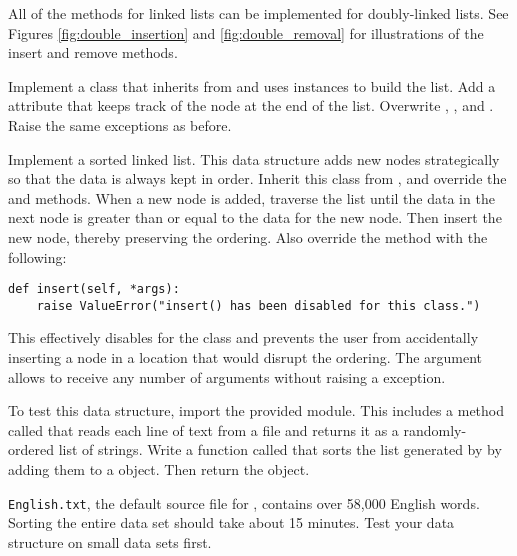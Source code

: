 \begin{figure>}
All of the methods for linked lists can be implemented for doubly-linked lists.
See Figures \ref{fig:double_insertion} and \ref{fig:double_removal} for illustrations of the insert and remove methods.

\begin{problem}
Implement a  class that inherits from  and uses  instances to build the list.
Add a  attribute that keeps track of the node at the end of the list.
Overwrite , , and .
Raise the same exceptions as before.
\end{problem}

\begin{problem}
Implement a sorted linked list.
This data structure adds new nodes strategically so that the data is always kept in order.
Inherit this class from , and override the  and  methods.
When a new node is added, traverse the list until the data in the next node is greater than or equal to the data for the new node.
Then insert the new node, thereby preserving the ordering.
Also override the  method with the following:

\begin{lstlisting}
def insert(self, *args):
	raise ValueError("insert() has been disabled for this class.")
\end{lstlisting}

This effectively disables  for the  class and prevents the user from accidentally inserting a node in a location that would disrupt the ordering.
The  argument allows  to receive any number of arguments without raising a  exception.

To test this data structure, import the provided  module.
This includes a method called  that reads each line of text from a file and returns it as a randomly-ordered list of strings.
Write a function called  that sorts the list generated by  by adding them to a  object.
Then return the object.

\begin{warn}
\texttt{English.txt}, the default source file for , contains over 58,000 English words.
Sorting the entire data set should take about 15 minutes.
Test your data structure on small data sets first.
\end{warn}
\end{problem}


\end{figure>}
